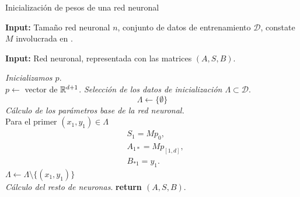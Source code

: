 \begin{algorithm}[H]
    \caption{Inicialización de pesos de una red neuronal}
    \label{algo:algoritmo-iniciar-pesos}
    \textbf{Input:} Tamaño red neuronal $n$, conjunto de datos de entrenamiento $\mathcal{D}$, constate $M$ involucrada en .

    \textbf{Input:} Red neuronal, representada con las matrices $(A,S,B)$.
    \hspace*{\algorithmicindent} 
    \begin{algorithmic}[1]
       \STATE \textit{Inicializamos $p$}. \\
       $p \gets$ vector de $\mathbb{R}^{d+1}$. 
       \STATE \textit{Selección  de los datos de inicialización
       $\Lambda \subset \mathcal{D}$}. \\
       \begin{equation}
           \Lambda \gets \{ \emptyset \}
       \end{equation}
       \STATE \textit{Cálculo de los parámetros base de la red neuronal.} \\
       
       Para el primer $(x_1, y_1) \in \Lambda$ \\
       \begin{align}
            &S_1 = M p_0, \\
            & A_{1 *} = M p_{[1,d]}, \\
            & B_{* 1} = y_1.
        \end{align}
       $\Lambda \gets \Lambda \setminus \{(x_1, y_1)\} $ \\
       \STATE \textit{Cálculo del resto de neuronas}. 
       \STATE \textbf{return $(A,S,B)$}.
    \end{algorithmic}  
\end{algorithm}

